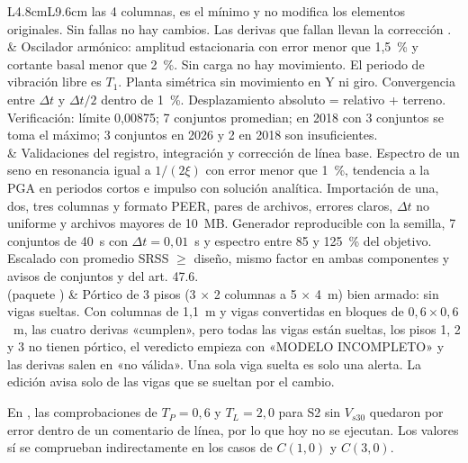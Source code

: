 \begin{longtable}{L{4.8cm}L{9.6cm}}
	las 4 columnas, es el mínimo y no modifica los elementos originales. Sin fallas no hay cambios. Las derivas que fallan
	llevan la corrección . \\
	 & Oscilador armónico: amplitud estacionaria con error menor que 1,5~\% y cortante basal menor
	que 2~\%. Sin carga no hay movimiento. El periodo de vibración libre es $T_1$. Planta simétrica sin movimiento en Y ni
	giro. Convergencia entre $\Delta t$ y $\Delta t/2$ dentro de 1~\%. Desplazamiento absoluto = relativo + terreno.
	Verificación: límite 0,00875; 7 conjuntos promedian; en 2018 con 3 conjuntos se toma el máximo; 3 conjuntos en 2026 y
	2 en 2018 son insuficientes. \\
	 & Validaciones del registro, integración y corrección de línea base. Espectro de un seno
	en resonancia igual a $1/(2\xi)$ con error menor que 1~\%, tendencia a la PGA en periodos cortos e impulso con solución
	analítica. Importación de una, dos, tres columnas y formato PEER, pares de archivos, errores claros, $\Delta t$ no
	uniforme y archivos mayores de 10~MB. Generador reproducible con la semilla, 7 conjuntos de 40~s con
	$\Delta t = 0{,}01$~s y espectro entre 85 y 125~\% del objetivo. Escalado con promedio SRSS $\ge$ diseño, mismo factor
	en ambas componentes y avisos de conjuntos y del art. 47.6. \\
	 (paquete ) & Pórtico de 3 pisos (3 $\times$ 2 columnas a 5 $\times$ 4~m) bien armado: sin
	vigas sueltas. Con columnas de 1,1~m y vigas convertidas en bloques de $0{,}6 \times 0{,}6$~m, las cuatro derivas
	«cumplen», pero todas las vigas están sueltas, los pisos 1, 2 y 3 no tienen pórtico, el veredicto empieza con «MODELO
	INCOMPLETO» y las derivas salen en  «no válida». Una sola viga suelta es solo una alerta. La edición avisa
	solo de las vigas que se sueltan por el cambio. \\
\end{longtable}

\begin{nota}
En , las comprobaciones de $T_P = 0{,}6$ y $T_L = 2{,}0$
para S2 sin $V_{s30}$ quedaron por error dentro de un comentario de línea, por lo que hoy no se ejecutan. Los valores sí
se comprueban indirectamente en los casos de $C(1{,}0)$ y $C(3{,}0)$.
\end{nota}

